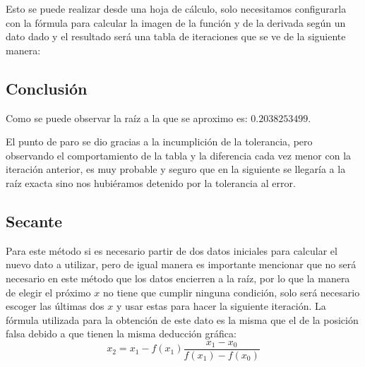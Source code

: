 \documentclass{article}
\begin{document}
Esto se puede realizar desde una hoja de cálculo, solo necesitamos configurarla con la fórmula para calcular la imagen
de la función y de la derivada según un dato dado y el resultado será una tabla de iteraciones que se ve de la siguiente
manera:


\begin{table*}[h] 
   \begin{adjustwidth}{-1.5cm}{0cm}
   \end{adjustwidth}
\end{table*}


\subsection*{Conclusión}
Como se puede observar la raíz a la que se aproximo es: $0.2038253499$.


El punto de paro se dio gracias a la incumplición de la tolerancia, pero observando el comportamiento de la tabla y la
diferencia cada vez menor con la iteración anterior, es muy probable y seguro que en la siguiente se llegaría a la raíz
exacta sino nos hubiéramos detenido por la tolerancia al error.


\subsection{Secante}
Para este método si es necesario partir de dos datos iniciales para calcular el nuevo dato a utilizar, pero de igual manera
es importante mencionar que no será necesario en este método que los datos encierren a la raíz, por lo que la manera de
elegir el próximo $x$ no tiene que cumplir ninguna condición, solo será necesario escoger las últimas dos $x$ y usar estas
para hacer la siguiente iteración. La fórmula utilizada para la obtención de este dato es la misma que el de la posición
falsa debido a que tienen la misma deducción gráfica: $$x_2=x_1-f(x_1)\frac{x_1-x_0}{f(x_1)-f(x_0)}$$
\end{document}
